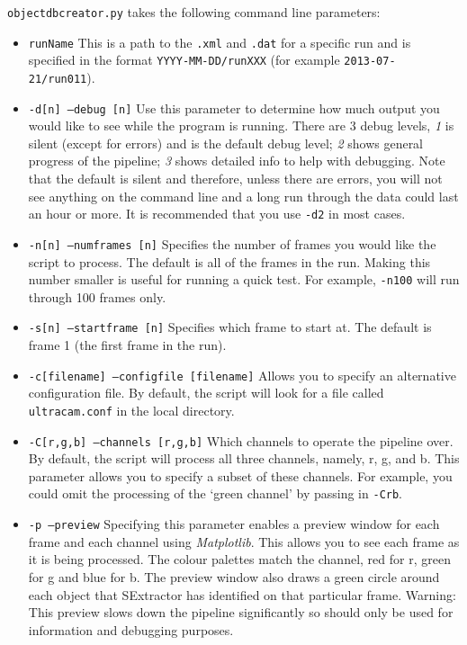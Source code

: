 \texttt{objectdbcreator.py} takes the following command line parameters:
\begin{itemize}
  \item \texttt{runName} This is a path to the \texttt{.xml} and \texttt{.dat} for a specific run and is specified in the format \texttt{YYYY-MM-DD/runXXX}  (for example \texttt{2013-07-21/run011}).
  \item \texttt{-d[n] --debug [n]} Use this parameter to determine how much output you would like to see while the program is running. There are 3 debug levels, \emph{1} is silent (except for errors) and is the default debug level; \emph{2} shows general progress of the pipeline; \emph{3} shows detailed info to help with debugging. Note that the default is silent and therefore, unless there are errors, you will not see anything on the command line and a long run through the data could last an hour or more. It is recommended that you use \texttt{-d2} in most cases. 
  \item \texttt{-n[n] --numframes [n]} Specifies the number of frames you would like the script to process. The default is all of the frames in the run. Making this number smaller is useful for running a quick test. For example, \texttt{-n100} will run through 100 frames only.
   \item \texttt{-s[n] --startframe [n]} Specifies which frame to start at. The default is frame 1 (the first frame in the run). 
  \item \texttt{-c[filename] --configfile [filename]} Allows you to specify an alternative configuration file. By default, the script will look for a file called \texttt{ultracam.conf} in the local directory. 
  \item \texttt{-C[r,g,b] --channels [r,g,b]} Which channels to operate the pipeline over. By default, the script will process all three channels, namely, r, g, and b. This parameter allows you to specify a subset of these channels. For example, you could omit the processing of the `green channel' by passing in \texttt{-Crb}. 
  \item \texttt{-p --preview} Specifying this parameter enables a preview window for each frame and each channel using \emph{Matplotlib}. This allows you to see each frame as it is being processed. The colour palettes match the channel, red for r, green for g and blue for b. The preview window also draws a green circle around each object that SExtractor has identified on that particular frame. Warning: This preview slows down the pipeline significantly so should only be used for information and debugging purposes. 

\end{itemize}

